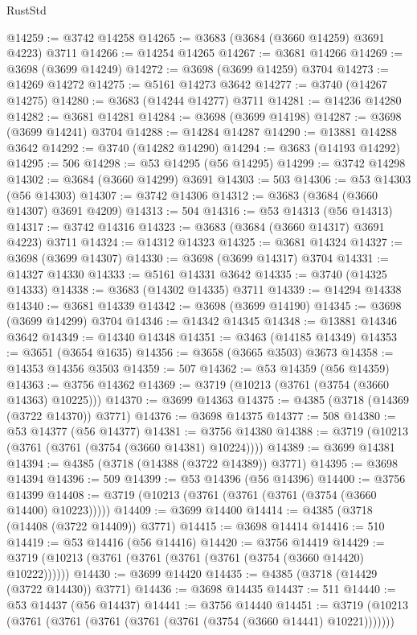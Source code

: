 \begin{lexlean}{RustStd}
\begin{coremodule}
@14259 := @3742 @14258
@14265 := @3683 (@3684 (@3660 @14259) @3691 @4223) @3711
@14266 := @14254 @14265
@14267 := @3681 @14266
@14269 := @3698 (@3699 @14249)
@14272 := @3698 (@3699 @14259) @3704
@14273 := @14269 @14272
@14275 := @5161 @14273 @3642
@14277 := @3740 (@14267 @14275)
@14280 := @3683 (@14244 @14277) @3711
@14281 := @14236 @14280
@14282 := @3681 @14281
@14284 := @3698 (@3699 @14198)
@14287 := @3698 (@3699 @14241) @3704
@14288 := @14284 @14287
@14290 := @13881 @14288 @3642
@14292 := @3740 (@14282 @14290)
@14294 := @3683 (@14193 @14292)
@14295 := 506
@14298 := @53 @14295 (@56 @14295)
@14299 := @3742 @14298
@14302 := @3684 (@3660 @14299) @3691
@14303 := 503
@14306 := @53 @14303 (@56 @14303)
@14307 := @3742 @14306
@14312 := @3683 (@3684 (@3660 @14307) @3691 @4209)
@14313 := 504
@14316 := @53 @14313 (@56 @14313)
@14317 := @3742 @14316
@14323 := @3683 (@3684 (@3660 @14317) @3691 @4223) @3711
@14324 := @14312 @14323
@14325 := @3681 @14324
@14327 := @3698 (@3699 @14307)
@14330 := @3698 (@3699 @14317) @3704
@14331 := @14327 @14330
@14333 := @5161 @14331 @3642
@14335 := @3740 (@14325 @14333)
@14338 := @3683 (@14302 @14335) @3711
@14339 := @14294 @14338
@14340 := @3681 @14339
@14342 := @3698 (@3699 @14190)
@14345 := @3698 (@3699 @14299) @3704
@14346 := @14342 @14345
@14348 := @13881 @14346 @3642
@14349 := @14340 @14348
@14351 := @3463 (@14185 @14349)
@14353 := @3651 (@3654 @1635)
@14356 := @3658 (@3665 @3503) @3673
@14358 := @14353 @14356 @3503
@14359 := 507
@14362 := @53 @14359 (@56 @14359)
@14363 := @3756 @14362
@14369 := @3719 (@10213 (@3761 (@3754 (@3660 @14363) @10225)))
@14370 := @3699 @14363
@14375 := @4385 (@3718 (@14369 (@3722 @14370)) @3771)
@14376 := @3698 @14375
@14377 := 508
@14380 := @53 @14377 (@56 @14377)
@14381 := @3756 @14380
@14388 := @3719 (@10213 (@3761 (@3761 (@3754 (@3660 @14381) @10224))))
@14389 := @3699 @14381
@14394 := @4385 (@3718 (@14388 (@3722 @14389)) @3771)
@14395 := @3698 @14394
@14396 := 509
@14399 := @53 @14396 (@56 @14396)
@14400 := @3756 @14399
@14408 := @3719 (@10213 (@3761 (@3761 (@3761 (@3754 (@3660 @14400) @10223)))))
@14409 := @3699 @14400
@14414 := @4385 (@3718 (@14408 (@3722 @14409)) @3771)
@14415 := @3698 @14414
@14416 := 510
@14419 := @53 @14416 (@56 @14416)
@14420 := @3756 @14419
@14429 := @3719 (@10213 (@3761 (@3761 (@3761 (@3761 (@3754 (@3660 @14420) @10222))))))
@14430 := @3699 @14420
@14435 := @4385 (@3718 (@14429 (@3722 @14430)) @3771)
@14436 := @3698 @14435
@14437 := 511
@14440 := @53 @14437 (@56 @14437)
@14441 := @3756 @14440
@14451 := @3719 (@10213 (@3761 (@3761 (@3761 (@3761 (@3761 (@3754 (@3660 @14441) @10221)))))))

\end{coremodule}
\end{lexlean}
